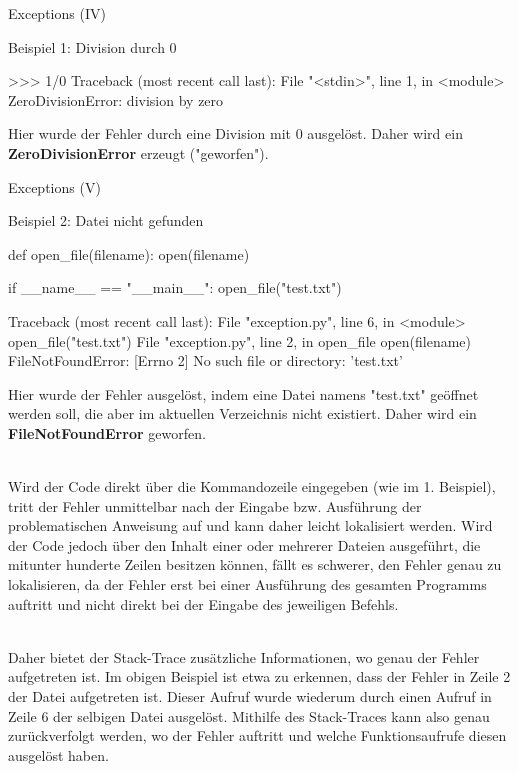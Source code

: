     \begin{frame}[fragile]{Exceptions (IV)}
\begin{exampleblock}{Beispiel 1: Division durch 0}
\begin{pyconcode}
>>> 1/0
Traceback (most recent call last):
  File "<stdin>", line 1, in <module>
ZeroDivisionError: division by zero
\end{pyconcode}            

Hier wurde der Fehler durch eine Division mit 0 ausgelöst. Daher wird ein \textbf{ZeroDivisionError} erzeugt ("geworfen").
\end{exampleblock}
    \end{frame}
    
    \begin{frame}{Exceptions (V)}
\begin{exampleblock}{Beispiel 2: Datei nicht gefunden}
\begin{pythoncode}
def open_file(filename):
    open(filename)


if __name__ == "__main__":
    open_file("test.txt")
\end{pythoncode}
\begin{pyconcode}
Traceback (most recent call last):
  File "exception.py", line 6, in <module>
    open_file("test.txt")
  File "exception.py", line 2, in open_file
    open(filename)
FileNotFoundError: [Errno 2] No such file or directory: 'test.txt'
\end{pyconcode}            

\end{exampleblock}
\begin{exampleblock}

Hier wurde der Fehler ausgelöst, indem eine Datei namens "test.txt" geöffnet werden soll, die aber im aktuellen Verzeichnis nicht existiert. Daher wird ein \textbf{FileNotFoundError} geworfen. \\~\

Wird der Code direkt über die Kommandozeile eingegeben (wie im 1. Beispiel), tritt der Fehler unmittelbar nach der Eingabe bzw. Ausführung der problematischen Anweisung auf und kann daher leicht lokalisiert werden. Wird der Code jedoch über den Inhalt einer oder mehrerer Dateien ausgeführt, die mitunter hunderte Zeilen besitzen können, fällt es schwerer, den Fehler genau zu lokalisieren, da der Fehler erst bei einer Ausführung des gesamten Programms auftritt und nicht direkt bei der Eingabe des jeweiligen Befehls. \\~\

Daher bietet der Stack-Trace zusätzliche Informationen, wo genau der Fehler aufgetreten ist. Im obigen Beispiel ist etwa zu erkennen, dass der Fehler in Zeile 2 der Datei  aufgetreten ist. Dieser Aufruf wurde wiederum durch einen Aufruf in Zeile 6 der selbigen Datei ausgelöst. Mithilfe des Stack-Traces kann also genau zurückverfolgt werden, wo der Fehler auftritt und welche Funktionsaufrufe diesen ausgelöst haben.
\end{exampleblock}
    
    \end{frame}
    
